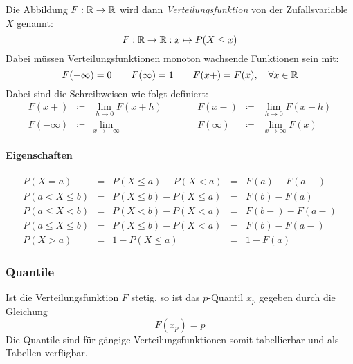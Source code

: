 			Die Abbildung \( F : \mathbb{R} \rightarrow \mathbb{R} \) wird dann \textit{Verteilungsfunktion} von der Zufallsvariable \(X\) genannt:
			\begin{equation*}
				F : \mathbb{R} \rightarrow \mathbb{R} : x \mapsto P(X \leq x)
			\end{equation*}
			Dabei müssen Verteilungsfunktionen monoton wachsende Funktionen sein mit:
			\begin{equation*}
				F(-\infty) = 0 \qquad F(\infty) = 1 \qquad F(x+) = F(x), \quad \forall x \in \mathbb{R}
			\end{equation*}
			Dabei sind die Schreibweisen wie folgt definiert:
			\begin{equation*}
				\begin{array}{rclcrcl}
					F(x+)      & \coloneqq & \lim\limits_{h \rightarrow 0} F(x + h) & \qquad & F(x-)     & \coloneqq & \lim\limits_{h \rightarrow 0} F(x - h)  \\
					F(-\infty) & \coloneqq & \lim\limits_{x \rightarrow -\infty}    & \qquad & F(\infty) & \coloneqq & \lim\limits_{x \rightarrow \infty} F(x)
				\end{array}
			\end{equation*}

			\paragraph{Eigenschaften}
				\begin{equation*}
					\begin{array}{rclcl}
						P(X = a)           & = & P(X \leq a) - P(X < a)    & = & F(a) - F(a-)  \\
						P(a < X \leq b)    & = & P(X \leq b) - P(X \leq a) & = & F(b) - F(a)   \\
						P(a \leq X < b)    & = & P(X < b) - P(X < a)       & = & F(b-) - F(a-) \\
						P(a \leq X \leq b) & = & P(X \leq b) - P(X < a)    & = & F(b) - F(a-)  \\
						P(X > a)           & = & 1 - P(X \leq a)           & = & 1 - F(a)
					\end{array}
				\end{equation*}

			\subsubsection{Quantile}
				Ist die Verteilungsfunktion \(F\) stetig, so ist das \(p\)-Quantil \(x_p\) gegeben durch die Gleichung
				\begin{equation*}
					F(x_p) = p
				\end{equation*}
				Die Quantile sind für gängige Verteilungsfunktionen somit tabellierbar und als Tabellen verfügbar.

